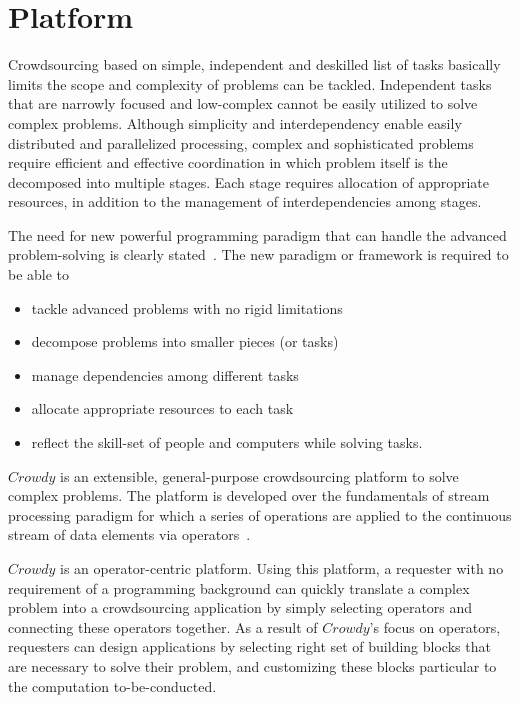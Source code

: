 \chapter{Platform}
\label{chap:platform}

Crowdsourcing based on simple, independent and deskilled list of tasks basically 
limits the scope and complexity of problems can be tackled. Independent tasks that 
are narrowly focused and low-complex cannot be easily utilized to solve complex 
problems. Although simplicity and interdependency enable easily distributed and 
parallelized processing, complex and sophisticated problems require efficient and 
effective coordination in which problem itself is the decomposed into multiple stages. 
Each stage requires allocation of appropriate resources, in addition to the management of interdependencies among stages.

The need for new powerful programming paradigm that can handle the advanced 
problem-solving is clearly stated~\cite{Doan2011, Kittur2013, Bernstein2012}. 
The new paradigm or framework is required to be able to 
\begin{itemize}
	\item tackle advanced problems with no rigid limitations
	\item decompose problems into smaller pieces (or tasks)
	\item manage dependencies among different tasks
	\item allocate appropriate resources to each task
	\item reflect the skill-set of people and computers while solving tasks.
\end{itemize}

$Crowdy$ is an extensible, general-purpose crowdsourcing platform to solve 
complex problems. The platform is developed over the fundamentals of stream 
processing paradigm for which a series of operations are applied to the continuous 
stream of data elements via operators~\cite{Gedik2014}.

$Crowdy$ is an operator-centric platform. Using this platform, a requester with no 
requirement of a programming background can quickly translate a complex problem into 
a crowdsourcing application by simply selecting operators and connecting these operators 
together. As a result of $Crowdy$'s focus on operators, requesters can design applications 
by selecting right set of building blocks that are necessary to solve their problem, 
and customizing these blocks particular to the computation to-be-conducted.

